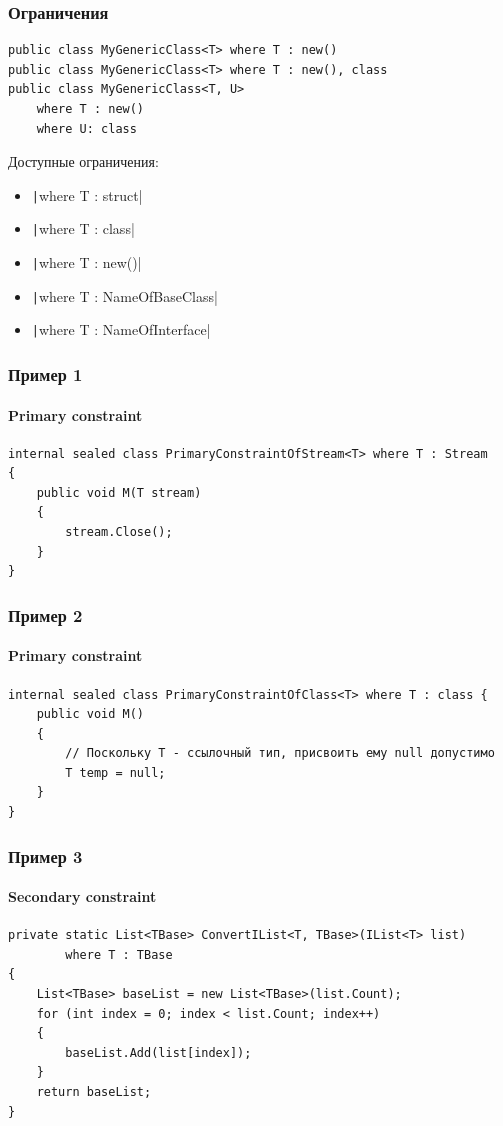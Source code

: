 \documentclass[xetex,mathserif,serif]{beamer}
\begin{document}
	\begin{frame}[fragile]
		\frametitle{Ограничения}
		\begin{verbatim}
public class MyGenericClass<T> where T : new()
public class MyGenericClass<T> where T : new(), class
public class MyGenericClass<T, U> 
    where T : new() 
    where U: class
		\end{verbatim}

		Доступные ограничения:
		\begin{itemize}
			\item \texttt|where T : struct|
			\item \texttt|where T : class|
			\item \texttt|where T : new()|
			\item \texttt|where T : NameOfBaseClass|
			\item \texttt|where T : NameOfInterface|
		\end{itemize}
	\end{frame}

	\begin{frame}[fragile]
		\frametitle{Пример 1}
		\framesubtitle{Primary constraint}
		\begin{footnotesize}
			\begin{verbatim}
internal sealed class PrimaryConstraintOfStream<T> where T : Stream 
{
    public void M(T stream) 
    {
        stream.Close();
    }
}
			\end{verbatim}
		\end{footnotesize}
	\end{frame}

	\begin{frame}[fragile]
		\frametitle{Пример 2}
		\framesubtitle{Primary constraint}
		\begin{footnotesize}
			\begin{verbatim}
internal sealed class PrimaryConstraintOfClass<T> where T : class {
    public void M() 
    {
        // Поскольку T - ссылочный тип, присвоить ему null допустимо
        T temp = null;
    }
}
			\end{verbatim}
		\end{footnotesize}
	\end{frame}

	\begin{frame}[fragile]
		\frametitle{Пример 3}
		\framesubtitle{Secondary constraint}
		\begin{footnotesize}
			\begin{verbatim}
private static List<TBase> ConvertIList<T, TBase>(IList<T> list)
        where T : TBase 
{
    List<TBase> baseList = new List<TBase>(list.Count);
    for (int index = 0; index < list.Count; index++) 
    {
        baseList.Add(list[index]);
    }
    return baseList;
}
			\end{verbatim}
		\end{footnotesize}
	\end{frame}
\end{document}
